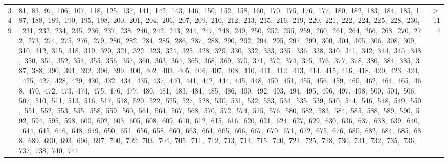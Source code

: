 \begin{longtable}{c|p{}|r}
349 & 81,\ 83,\ 97,\ 106,\ 107,\ 118,\ 125,\ 137,\ 141,\ 142,\ 143,\ 146,\ 150,\ 152,\ 158,\ 160,\ 170,\ 175,\ 176,\ 177,\ 180,\ 182,\ 183,\ 184,\ 185,\ 187,\ 188,\ 189,\ 190,\ 195,\ 198,\ 200,\ 201,\ 204,\ 206,\ 207,\ 209,\ 210,\ 212,\ 213,\ 215,\ 216,\ 219,\ 220,\ 221,\ 222,\ 224,\ 225,\ 228,\ 230,\ 231,\ 232,\ 234,\ 235,\ 236,\ 237,\ 238,\ 240,\ 242,\ 243,\ 244,\ 247,\ 248,\ 249,\ 250,\ 252,\ 255,\ 259,\ 260,\ 261,\ 264,\ 266,\ 268,\ 270,\ 272,\ 273,\ 274,\ 275,\ 276,\ 279,\ 280,\ 282,\ 284,\ 285,\ 286,\ 287,\ 288,\ 290,\ 292,\ 294,\ 295,\ 297,\ 299,\ 300,\ 304,\ 305,\ 306,\ 308,\ 309,\ 310,\ 312,\ 315,\ 318,\ 319,\ 320,\ 321,\ 322,\ 323,\ 324,\ 325,\ 328,\ 329,\ 330,\ 332,\ 333,\ 335,\ 336,\ 338,\ 340,\ 341,\ 342,\ 344,\ 345,\ 348,\ 350,\ 351,\ 352,\ 354,\ 355,\ 356,\ 357,\ 360,\ 363,\ 364,\ 365,\ 368,\ 369,\ 370,\ 371,\ 372,\ 374,\ 375,\ 376,\ 377,\ 378,\ 380,\ 384,\ 385,\ 387,\ 388,\ 390,\ 391,\ 392,\ 396,\ 399,\ 400,\ 402,\ 403,\ 405,\ 406,\ 407,\ 408,\ 410,\ 411,\ 412,\ 413,\ 414,\ 415,\ 416,\ 418,\ 420,\ 423,\ 424,\ 425,\ 427,\ 428,\ 429,\ 430,\ 432,\ 434,\ 435,\ 437,\ 440,\ 441,\ 442,\ 444,\ 445,\ 448,\ 450,\ 451,\ 455,\ 456,\ 459,\ 460,\ 462,\ 464,\ 465,\ 468,\ 470,\ 472,\ 473,\ 474,\ 475,\ 476,\ 477,\ 480,\ 481,\ 483,\ 484,\ 485,\ 486,\ 490,\ 492,\ 493,\ 494,\ 495,\ 496,\ 497,\ 498,\ 500,\ 504,\ 506,\ 507,\ 510,\ 511,\ 513,\ 516,\ 517,\ 518,\ 520,\ 522,\ 525,\ 527,\ 528,\ 530,\ 531,\ 532,\ 533,\ 534,\ 535,\ 539,\ 540,\ 544,\ 546,\ 548,\ 549,\ 550,\ 551,\ 552,\ 553,\ 555,\ 558,\ 559,\ 560,\ 561,\ 564,\ 567,\ 568,\ 570,\ 572,\ 574,\ 575,\ 576,\ 580,\ 582,\ 583,\ 584,\ 585,\ 588,\ 589,\ 590,\ 592,\ 594,\ 595,\ 598,\ 600,\ 602,\ 603,\ 605,\ 608,\ 609,\ 610,\ 612,\ 615,\ 616,\ 620,\ 621,\ 624,\ 627,\ 629,\ 630,\ 636,\ 637,\ 638,\ 639,\ 640,\ 644,\ 645,\ 646,\ 648,\ 649,\ 650,\ 651,\ 656,\ 658,\ 660,\ 663,\ 664,\ 665,\ 666,\ 667,\ 670,\ 671,\ 672,\ 675,\ 676,\ 680,\ 682,\ 684,\ 685,\ 688,\ 689,\ 690,\ 693,\ 696,\ 697,\ 700,\ 702,\ 703,\ 704,\ 705,\ 711,\ 712,\ 713,\ 714,\ 715,\ 720,\ 721,\ 725,\ 728,\ 730,\ 731,\ 732,\ 735,\ 736,\ 737,\ 738,\ 740,\ 741 & $\ge$ 114 \\

\end{longtable}
